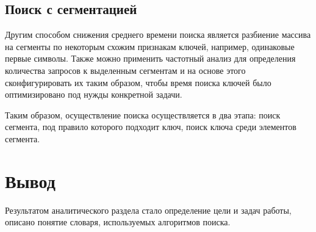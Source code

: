 \subsection{Поиск с сегментацией}
	Другим способом снижения среднего времени поиска является разбиение массива на сегменты по некоторым схожим признакам ключей, например, одинаковые первые символы. Также можно применить частотный анализ для определения количества запросов к выделенным сегментам и на основе этого сконфигурировать их таким образом, чтобы время поиска ключей было оптимизировано под нужды конкретной задачи.
	
	Таким образом, осуществление поиска осуществляется в два этапа: поиск сегмента, под правило которого подходит ключ, поиск ключа среди элементов сегмента.

\section*{Вывод}
Результатом аналитического раздела стало определение цели и задач работы, описано понятие словаря, используемых алгоритмов поиска.